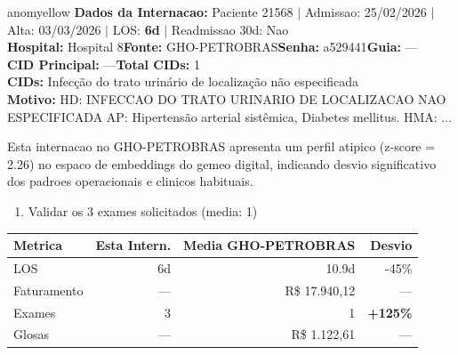 \documentclass[a4paper,10pt]{article}
\begin{document}
\begin{anomalycard}[Internacao 166665 | GHO-PETROBRAS | MODERADO (z=2.26)]{anomyellow}
\textbf{Dados da Internacao:} Paciente 21568 $\mid$ Admissao: 25/02/2026 $\mid$ Alta: 03/03/2026 $\mid$ LOS: \textbf{6d} $\mid$ Readmissao 30d: Nao\\
\textbf{Hospital:} Hospital 8\quad\textbf{Fonte:} GHO-PETROBRAS\quad\textbf{Senha:} a529441\quad\textbf{Guia:} ---\\
\textbf{CID Principal:} {\small ---}\quad\textbf{Total CIDs:} 1\\

\textbf{CIDs:} {\scriptsize Infecção do trato urinário de localização não especificada}\\

\textbf{Motivo:} {\scriptsize HD: INFECCAO DO TRATO URINARIO DE LOCALIZACAO NAO ESPECIFICADA  AP: Hipertensão arterial sistêmica, Diabetes mellitus.  HMA:  ...}\\

\vspace{2pt}\begin{tcolorbox}[colback=severityred!20,colframe=anomyellow,title={\textbf{Interpretacao de Negocio}},fonttitle=\bfseries\small,left=4pt,right=4pt,top=3pt,bottom=3pt]
{\small Esta internacao no GHO-PETROBRAS apresenta um perfil atipico (z-score = 2.26) no espaco de embeddings do gemeo digital, indicando desvio significativo dos padroes operacionais e clinicos habituais.}
\end{tcolorbox}
\begin{tcolorbox}[colback=severityyellow!30,colframe=anomorange,title={\textbf{Recomendacoes Especificas}},fonttitle=\bfseries\small,left=4pt,right=4pt,top=3pt,bottom=3pt]
\begin{enumerate}[nosep,leftmargin=16pt]
\item {\small Validar os 3 exames solicitados (media: 1)}
\end{enumerate}
\end{tcolorbox}
\begin{center}\begin{tabular}{l r r r}\toprule\textbf{Metrica} & \textbf{Esta Intern.} & \textbf{Media GHO-PETROBRAS} & \textbf{Desvio} \\\midrule
LOS & 6d & 10.9d & -45\% \\
Faturamento & --- & R\$ 17.940,12 & --- \\
Exames & 3 & 1 & \textcolor{anomred}{\textbf{+125\%}} \\
Glosas & --- & R\$ 1.122,61 & --- \\
\bottomrule\end{tabular}\end{center}


\end{anomalycard}
\end{document}
